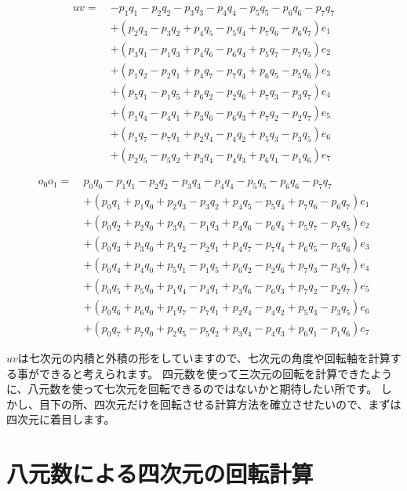 \documentclass[a4paper,12pt,notitlepage]{jsreport}
\begin{document}
\begin{equation}
  \begin{split}
    uv=~&-p_1q_1-p_2q_2-p_3q_3-p_4q_4-p_5q_5-p_6q_6-p_7q_7\\
    &+(p_2q_3-p_3q_2+p_4q_5-p_5q_4+p_7q_6-p_6q_7)e_1\\
    &+(p_3q_1-p_1q_3+p_4q_6-p_6q_4+p_5q_7-p_7q_5)e_2\\
    &+(p_1q_2-p_2q_1+p_4q_7-p_7q_4+p_6q_5-p_5q_6)e_3\\
    &+(p_5q_1-p_1q_5+p_6q_2-p_2q_6+p_7q_3-p_3q_7)e_4\\
    &+(p_1q_4-p_4q_1+p_3q_6-p_6q_3+p_7q_2-p_2q_7)e_5\\
    &+(p_1q_7-p_7q_1+p_2q_4-p_4q_2+p_5q_3-p_3q_5)e_6\\
    &+(p_2q_5-p_5q_2+p_3q_4-p_4q_3+p_6q_1-p_1q_6)e_7
  \end{split}
\end{equation}

\begin{equation}
  \begin{split}
    o_0o_1=~&p_0q_0-p_1q_1-p_2q_2-p_3q_3-p_4q_4-p_5q_5-p_6q_6-p_7q_7\\
    &+(p_0q_1+p_1q_0+p_2q_3-p_3q_2+p_4q_5-p_5q_4+p_7q_6-p_6q_7)e_1\\
    &+(p_0q_2+p_2q_0+p_3q_1-p_1q_3+p_4q_6-p_6q_4+p_5q_7-p_7q_5)e_2\\
    &+(p_0q_3+p_3q_0+p_1q_2-p_2q_1+p_4q_7-p_7q_4+p_6q_5-p_5q_6)e_3\\
    &+(p_0q_4+p_4q_0+p_5q_1-p_1q_5+p_6q_2-p_2q_6+p_7q_3-p_3q_7)e_4\\
    &+(p_0q_5+p_5q_0+p_1q_4-p_4q_1+p_3q_6-p_6q_3+p_7q_2-p_2q_7)e_5\\
    &+(p_0q_6+p_6q_0+p_1q_7-p_7q_1+p_2q_4-p_4q_2+p_5q_3-p_3q_5)e_6\\
    &+(p_0q_7+p_7q_0+p_2q_5-p_5q_2+p_3q_4-p_4q_3+p_6q_1-p_1q_6)e_7
  \end{split}
\end{equation}

$uv$は七次元の内積と外積の形をしていますので、七次元の角度や回転軸を計算する事ができると考えられます。
四元数を使って三次元の回転を計算できたように、八元数を使って七次元を回転できるのではないかと期待したい所です。
しかし、目下の所、四次元だけを回転させる計算方法を確立させたいので、まずは四次元に着目します。

\section{八元数による四次元の回転計算}
\end{document}
